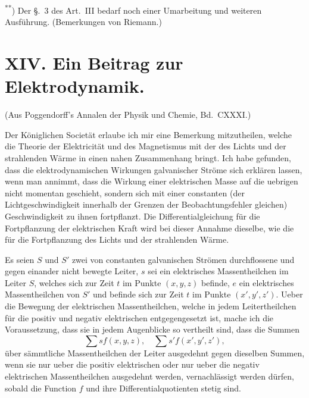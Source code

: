 \documentclass[12pt,a4paper]{article}
\begin{document}
\small\textsuperscript{**}) Der \S.~3 des Art.~III bedarf noch einer Umarbeitung und weiteren Ausf\"uhrung. (Bemerkungen von Riemann.)

\newpage
\section*{XIV. Ein Beitrag zur Elektrodynamik.}

\noindent\small{(Aus Poggendorff's Annalen der Physik und Chemie, Bd.~CXXXI.)}

\medskip

\normalsize
Der K\"oniglichen Societ\"at erlaube ich mir eine Bemerkung mitzutheilen, welche die Theorie der Elektricit\"at und des Magnetismus mit der des Lichts und der strahlenden W\"arme in einen nahen Zusammenhang bringt. Ich habe gefunden, dass die elektrodynamischen Wirkungen galvanischer Str\"ome sich erkl\"aren lassen, wenn man annimmt, dass die Wirkung einer elektrischen Masse auf die uebrigen nicht momentan geschieht, sondern sich mit einer constanten (der Lichtgeschwindigkeit innerhalb der Grenzen der Beobachtungsfehler gleichen) Geschwindigkeit zu ihnen fortpflanzt. Die Differentialgleichung f\"ur die Fortpflanzung der elektrischen Kraft wird bei dieser Annahme dieselbe, wie die f\"ur die Fortpflanzung des Lichts und der strahlenden W\"arme.

Es seien $S$ und $S'$ zwei von constanten galvanischen Str\"omen durchflossene und gegen einander nicht bewegte Leiter, $s$ sei ein elektrisches Massentheilchen im Leiter $S$, welches sich zur Zeit $t$ im Punkte $(x,y,z)$ befinde, $e$ ein elektrisches Massentheilchen von $S'$ und befinde sich zur Zeit $t$ im Punkte $(x',y',z')$. Ueber die Bewegung der elektrischen Massentheilchen, welche in jedem Leitertheilchen f\"ur die positiv und negativ elektrischen entgegengesetzt ist, mache ich die Voraussetzung, dass sie in jedem Augenblicke so vertheilt sind, dass die Summen
\[\sum s f(x,y,z), \quad \sum s' f(x',y',z'),\]
\"uber s\"ammtliche Massentheilchen der Leiter ausgedehnt gegen dieselben Summen, wenn sie nur ueber die positiv elektrischen oder nur ueber die negativ elektrischen Massentheilchen ausgedehnt werden, vernachl\"assigt werden d\"urfen, sobald die Function $f$ und ihre Differentialquotienten stetig sind.
\end{document}
